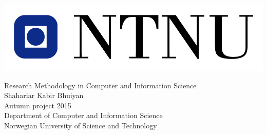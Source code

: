 \begin{titlepage}
\thispagestyle{empty}
\includegraphics[scale=1.1]{ntnu-logo}
\mbox{}\\[6pc]
\begin{center}
\vspace{3cm}
\Huge{Research Methodology in Computer and Information Science}\\[2pc]

\Large{Shahariar Kabir Bhuiyan}\\[1pc]
\large{Autumn project 2015}\\[2pc]
\vspace{3cm}
Department of Computer and Information Science\\
Norwegian University of Science and Technology
\end{center}
\vfill
\end{titlepage}